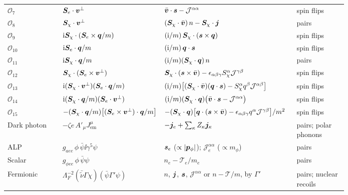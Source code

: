 \begin{table}[tbp]
\begin{tabular}{@{}l>{\raggedright\arraybackslash}p{0.25\linewidth}>{\raggedright\arraybackslash}p{0.39\linewidth}>{\raggedright\arraybackslash}p{0.15\linewidth}@{}}
    $\mathcal{O}_7$ & $\bm{S}_e\cdot\bm{v}^\perp$ & $\bar{\bm{v}}\cdot\bm{s} - \mathcal{J}^{\alpha\alpha}$ & spin flips \\
    $\mathcal{O}_8$ & $\bm{S}_\chi\cdot\bm{v}^\perp$ & $(\bm{S}_\chi\cdot\bar{\bm{v}})\,n - \bm{S}_\chi\cdot\bm{j}$ & pairs \\
    $\mathcal{O}_9$ & $\mathrm{i}\bm{S}_\chi\cdot(\bm{S}_e\times\bm{q}/m)$ & $(\mathrm{i}/m)\,\bm{S}_\chi\cdot(\bm{s}\times\bm{q})$ & spin flips \\
    $\mathcal{O}_{10}$ & $\mathrm{i}\bm{S}_e\cdot\bm{q}/m$ & $(\mathrm{i}/m)\,\bm{q}\cdot\bm{s}$ & spin flips \\
    $\mathcal{O}_{11}$ & $\mathrm{i}\bm{S}_\chi\cdot\bm{q}/m$ & $(\mathrm{i}/m)(\bm{S}_\chi\cdot\bm{q})\,n$ & pairs \\
    $\mathcal{O}_{12}$ & $\bm{S}_\chi\cdot(\bm{S}_e\times\bm{v}^\perp)$ & $\bm{S}_\chi\cdot(\bm{s}\times\bar{\bm{v}}) - \epsilon_{\alpha\beta\gamma}S^\alpha_\chi\mathcal{J}^{\gamma\beta}$ & spin flips \\
    $\mathcal{O}_{13}$ & $\mathrm{i}(\bm{S}_\chi\cdot\bm{v}^\perp)(\bm{S}_e\cdot\bm{q}/m)$ & $(\mathrm{i}/m)\bigl[(\bm{S}_\chi\cdot\bar{\bm{v}})(\bm{q}\cdot\bm{s}) - S^\alpha_\chi q^\beta\mathcal{J}^{\alpha\beta}\bigr]$ & spin flips \\
    $\mathcal{O}_{14}$ & $\mathrm{i}(\bm{S}_\chi\cdot\bm{q}/m)(\bm{S}_e\cdot\bm{v}^\perp)$ & $(\mathrm{i}/m)(\bm{S}_\chi\cdot\bm{q})\bigl(\bar{\bm{v}}\cdot\bm{s} - \mathcal{J}^{\alpha\alpha}\bigr)$ & spin flips \\
    $\mathcal{O}_{15}$ & $-(\bm{S}_\chi\cdot\bm{q}/m)\bigl[(\bm{S}_e\times\bm{v}^\perp)\cdot\bm{q}/m\bigr]$ & $-(\bm{S}_\chi\cdot\bm{q})\bigl[\bm{q}\cdot(\bm{s}\times\bar{\bm{v}}) - \epsilon_{\alpha\beta\gamma}q^\alpha\mathcal{J}^{\gamma\beta}\bigr]/m^2$ & spin flips \\
    \midrule
    Dark photon & $-\zeta e\,A'_\mu J^\mu_{\mathrm{em}}$ & $-\bm{j}_e + \sum_\kappa Z_\kappa\bm{j}_\kappa$ & pairs; polar phonons \\
    ALP & $g_{aee}\,\phi\,\bar\psi\ii\gamma^5\psi$ & $\bm{s}_e$ ($\propto|\bm{p}_\phi|$); $\mathcal{J}^{\alpha\alpha}_e$ ($\propto m_\phi$) & pairs \\
    Scalar & $g_{\phi ee}\,\phi\,\bar\psi\psi$ & $n_e - \mathcal{T}_e/m_e$ & pairs \\
    Fermionic & $\Lambda_F^{-2}(\bar{\tilde\nu}\Gamma\chi)(\bar\psi\Gamma'\psi)$ & $n$, $\bm{j}$, $\bm{s}$, $\mathcal{J}^{\alpha\alpha}$ or $n - \mathcal{T}/m$, by $\Gamma'$ & pairs; nuclear recoils \\
    \bottomrule
  \end{tabular}
\end{table}

